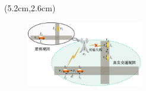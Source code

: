 \begin{frame}
\begin{center}
\begin{textblock*}{\textwidth}(5.2cm,2.6cm)
\begin{figure}
\includegraphics[width=0.45\textwidth]{fig/Fig5-1-example.pdf}
\end{figure}
\end{textblock*}
\end{center}

\end{frame}

